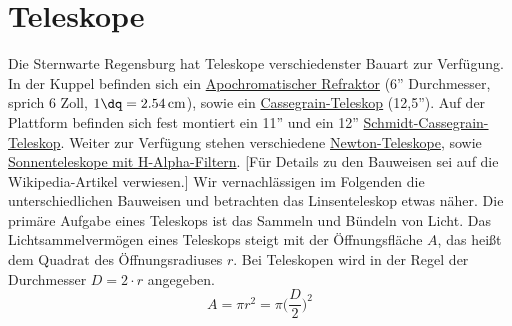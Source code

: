 \documentclass[10pt,a4paper,titlepage]{article}
\begin{document}
\section{Teleskope}
Die Sternwarte Regensburg hat Teleskope verschiedenster Bauart zur Verfügung. In der Kuppel befinden sich ein \href{https://de.wikipedia.org/wiki/Apochromat}{Apochromatischer Refraktor} (6'' Durchmesser, sprich 6 Zoll, $1\dq = \SI{2,54}{cm}$), sowie ein \href{https://de.wikipedia.org/wiki/Cassegrain-Teleskop}{Cassegrain-Teleskop} (12,5''). Auf der Plattform befinden sich fest montiert ein 11'' und ein 12'' \href{https://de.wikipedia.org/wiki/Schmidt-Cassegrain-Teleskop}{Schmidt-Cassegrain-Teleskop}. Weiter zur Verfügung stehen verschiedene \href{https://de.wikipedia.org/wiki/Newton-Teleskop}{Newton-Teleskope}, sowie \href{https://de.wikipedia.org/wiki/H-alpha-Teleskop}{Sonnenteleskope mit H-Alpha-Filtern}. [Für Details zu den Bauweisen sei auf die Wikipedia-Artikel verwiesen.]
Wir vernachlässigen im Folgenden die unterschiedlichen Bauweisen und betrachten das Linsenteleskop etwas näher. Die primäre Aufgabe eines Teleskops ist das Sammeln und Bündeln von Licht. Das Lichtsammelvermögen eines Teleskops steigt mit der Öffnungsfläche $A$, das heißt dem Quadrat des Öffnungsradiuses $r$. Bei Teleskopen wird in der Regel der Durchmesser $D = 2 \cdot r$ angegeben.
\begin{equation}
A = \pi r^2 = \pi \biggr ( \frac{D}{2} \biggr )^2
\end{equation}
\end{document}

